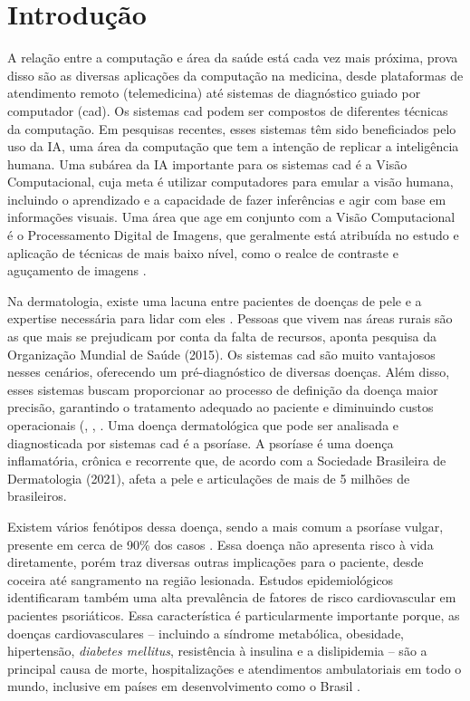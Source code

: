 \section{Introdução}
A relação entre a computação e área da saúde está cada vez mais próxima, prova disso são as diversas aplicações da computação na medicina, desde plataformas de atendimento remoto (telemedicina) até sistemas de diagnóstico guiado por computador (\gls{cad}).
Os sistemas \gls{cad} podem ser compostos de diferentes técnicas da computação. Em pesquisas recentes, esses sistemas têm sido beneficiados pelo uso da \ac{IA}, uma área da computação que tem a intenção de replicar a inteligência humana. Uma subárea da \acs{IA} importante para os sistemas \gls{cad} é a Visão Computacional, cuja meta é utilizar computadores para emular a visão humana, incluindo o aprendizado e a capacidade de fazer inferências e agir com base em informações visuais. Uma área que age em conjunto com a Visão Computacional é o Processamento Digital de Imagens, que geralmente está atribuída no estudo e aplicação de técnicas de mais baixo nível, como o realce de contraste e aguçamento de imagens \cite{gonzalez2008digital}.

Na dermatologia, existe uma lacuna entre pacientes de doenças de pele e a expertise necessária para lidar com eles \cite{Hameed2019}. Pessoas que vivem nas áreas rurais são as que mais se prejudicam por conta da falta de recursos, aponta pesquisa da Organização Mundial de Saúde (2015). Os sistemas \gls{cad} são muito vantajosos nesses cenários, oferecendo um pré-diagnóstico de diversas doenças. Além disso, esses sistemas buscam proporcionar ao processo de definição da doença maior precisão, garantindo o tratamento adequado ao paciente e diminuindo custos operacionais (\cite{Hameed2019}, \cite{DASH2020106240}, \cite{Arora2021}. Uma doença dermatológica que pode ser analisada e diagnosticada por sistemas \gls{cad} é a psoríase. A psoríase é uma doença inflamatória, crônica e recorrente que, de acordo com a Sociedade Brasileira de Dermatologia (2021), afeta a pele e articulações de mais de 5 milhões de brasileiros.

Existem vários fenótipos dessa doença, sendo a mais comum a psoríase vulgar, presente em cerca de 90\% dos casos \cite{Griffiths2007}. Essa doença não apresenta risco à vida diretamente, porém traz diversas outras implicações para o paciente, desde coceira até sangramento na região lesionada. Estudos epidemiológicos identificaram também uma alta prevalência de fatores de risco cardiovascular em pacientes psoriáticos. Essa característica é particularmente importante porque, as doenças cardiovasculares -- incluindo a síndrome metabólica, obesidade, hipertensão, \textit{diabetes mellitus}, resistência à insulina e a dislipidemia \cite{Miller2013} -- são a principal causa de morte, hospitalizações e atendimentos ambulatoriais em todo o mundo, inclusive em países em desenvolvimento como o Brasil \cite{Barroso2021}.

